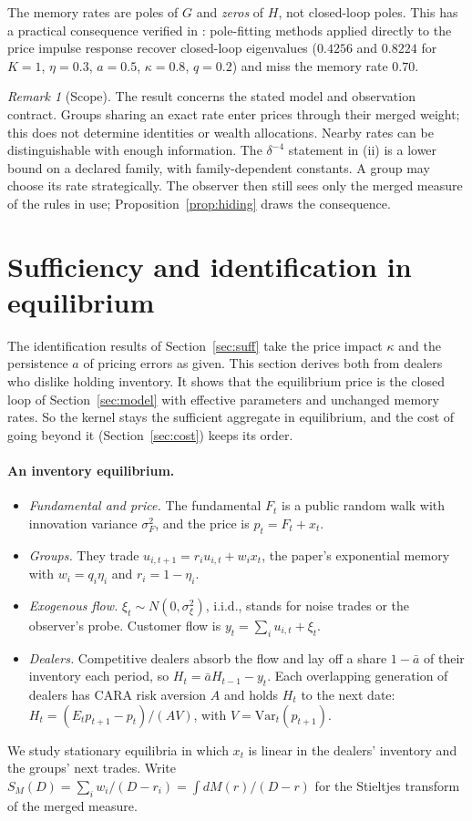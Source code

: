 \documentclass[12pt]{article}
\theoremstyle{definition}
\theoremstyle{remark}
\newtheorem{remark}[theorem]{Remark}
\begin{document}
The memory rates are poles of $G$ and \emph{zeros} of $H$, not closed-loop poles. This has a practical consequence verified in \citet{niroula2026a}: pole-fitting methods applied directly to the price impulse response recover closed-loop eigenvalues ($0.4256$ and $0.8224$ for $K=1$, $\eta=0.3$, $a=0.5$, $\kappa=0.8$, $q=0.2$) and miss the memory rate $0.70$.
\begin{remark}[Scope]\label{rem:scope}
The result concerns the stated model and observation contract. Groups sharing an exact rate enter prices through their merged weight; this does not determine identities or wealth allocations. Nearby rates can be distinguishable with enough information. The $\delta^{-4}$ statement in (ii) is a lower bound on a declared family, with family-dependent constants. A group may choose its rate strategically. The observer then still sees only the merged measure of the rules in use; Proposition~\ref{prop:hiding} draws the consequence.
\end{remark}
\section{Sufficiency and identification in equilibrium}\label{sec:equilibrium}

The identification results of Section~\ref{sec:suff} take the price impact $\kappa$ and the persistence $a$ of pricing errors as given. This section derives both from dealers who dislike holding inventory. It shows that the equilibrium price is the closed loop of Section~\ref{sec:model} with effective parameters and unchanged memory rates. So the kernel stays the sufficient aggregate in equilibrium, and the cost of going beyond it (Section~\ref{sec:cost}) keeps its order.


\paragraph{An inventory equilibrium.}
\begin{itemize}[itemsep=1pt,topsep=2pt]
\item \emph{Fundamental and price.} The fundamental $F_t$ is a public random walk with innovation variance $\sigma_F^2$, and the price is $p_t=F_t+x_t$.
\item \emph{Groups.} They trade $u_{i,t+1}=r_iu_{i,t}+w_ix_t$, the paper's exponential memory with $w_i=q_i\eta_i$ and $r_i=1-\eta_i$.
\item \emph{Exogenous flow.} $\xi_t\sim N(0,\sigma_\xi^2)$, i.i.d., stands for noise trades or the observer's probe. Customer flow is $y_t=\sum_iu_{i,t}+\xi_t$.
\item \emph{Dealers.} Competitive dealers absorb the flow and lay off a share $1-\bar a$ of their inventory each period, so $H_t=\bar aH_{t-1}-y_t$. Each overlapping generation of dealers has CARA risk aversion $A$ and holds $H_t$ to the next date: $H_t=(E_tp_{t+1}-p_t)/(AV)$, with $V=\mathrm{Var}_t(p_{t+1})$.
\end{itemize}
We study stationary equilibria in which $x_t$ is linear in the dealers' inventory and the groups' next trades. Write $S_M(D)=\sum_iw_i/(D-r_i)=\int dM(r)/(D-r)$ for the Stieltjes transform of the merged measure.
\end{document}
